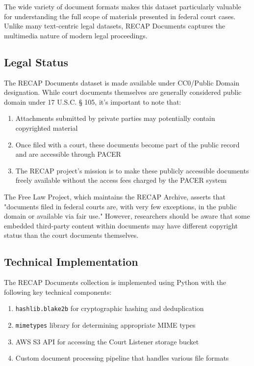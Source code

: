 The wide variety of document formats makes this dataset particularly valuable for understanding the full scope of materials presented in federal court cases. Unlike many text-centric legal datasets, RECAP Documents captures the multimedia nature of modern legal proceedings.

\subsection{Legal Status}

The RECAP Documents dataset is made available under CC0/Public Domain designation. While court documents themselves are generally considered public domain under 17 U.S.C. § 105, it's important to note that:

\begin{enumerate}
    \item Attachments submitted by private parties may potentially contain copyrighted material
    \item Once filed with a court, these documents become part of the public record and are accessible through PACER
    \item The RECAP project's mission is to make these publicly accessible documents freely available without the access fees charged by the PACER system
\end{enumerate}

The Free Law Project, which maintains the RECAP Archive, asserts that "documents filed in federal courts are, with very few exceptions, in the public domain or available via fair use." However, researchers should be aware that some embedded third-party content within documents may have different copyright status than the court documents themselves.

\subsection{Technical Implementation}

The RECAP Documents collection is implemented using Python with the following key technical components:

\begin{enumerate}
    \item \texttt{hashlib.blake2b} for cryptographic hashing and deduplication
    \item \texttt{mimetypes} library for determining appropriate MIME types
    \item AWS S3 API for accessing the Court Listener storage bucket
    \item Custom document processing pipeline that handles various file formats
\end{enumerate}


